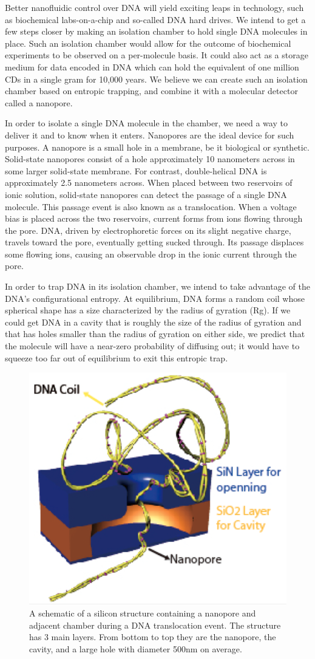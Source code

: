\documentclass[aps,prl,preprint,groupedaddress]{revtex4}
\begin{document}
Better nanofluidic control over DNA will yield exciting leaps in technology, such as biochemical labs-on-a-chip and so-called DNA hard drives.
We intend to get a few steps closer by making an isolation chamber to hold single DNA molecules in place.
Such an isolation chamber would allow for the outcome of biochemical experiments to be observed on a per-molecule basis.
It could also act as a storage medium for data encoded in DNA which can hold the equivalent of one million CDs in a single gram for 10,000 years\cite{dna-hard-drive}.
We believe we can create such an isolation chamber based on entropic trapping, and combine it with a molecular detector called a nanopore.

In order to isolate a single DNA molecule in the chamber, we need a way to deliver it and to know when it enters.
Nanopores are the ideal device for such purposes.
A nanopore is a small hole in a membrane, be it biological or synthetic.
Solid-state nanopores consist of a hole approximately 10 nanometers across in some larger solid-state membrane.
For contrast, double-helical DNA is approximately 2.5 nanometers across.
When placed between two reservoirs of ionic solution, solid-state nanopores can detect the passage of a single DNA molecule.
This passage event is also known as a translocation.
When a voltage bias is placed across the two reservoirs, current forms from ions flowing through the pore.
DNA, driven by electrophoretic forces on its slight negative charge, travels toward the pore, eventually getting sucked through.
Its passage displaces some flowing ions, causing an observable drop in the ionic current through the pore.

In order to trap DNA in its isolation chamber, we intend to take advantage of the DNA’s configurational entropy.
At equilibrium, DNA forms a random coil whose spherical shape has a size characterized by the radius of gyration (Rg).
If we could get DNA in a cavity that is roughly the size of the radius of gyration and that has holes smaller than the radius of gyration on either side, we predict that the molecule will have a near-zero probability of diffusing out; it would have to squeeze too far out of equilibrium to exit this entropic trap.\cite{trapping}

\begin{figure}
\centering
\includegraphics[width=.4\textwidth]{figures/nanopore-schematic}
\caption{A schematic of a silicon structure containing a nanopore and adjacent chamber during a DNA translocation event.
The structure has 3 main layers.
From bottom to top they are the nanopore, the cavity, and a large hole with diameter 500nm on average.}
\label{fig:nanopore-schematic}
\end{figure}
\end{document}
